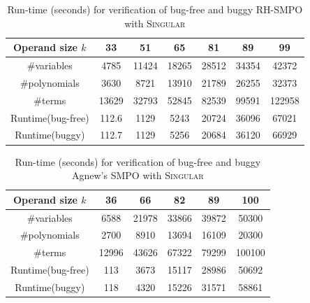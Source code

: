 \begin{table}[bp]
\centering
\caption{\small Run-time (seconds) for verification of bug-free and
  buggy RH-SMPO with \textsc{Singular}} 
\label{tbl:exp1}  
\begin{tabular}{|c||c|c|c|c|c|c|} 
\hline
Operand size $k$ & 33 & 51 & 65 & 81 & 89 & 99\\
\hline
\#variables & 4785 & 11424 & 18265 & 28512 & 34354 & 42372\\
\hline
\#polynomials & 3630 & 8721 & 13910 & 21789 & 26255 & 32373\\
\hline
\#terms & 13629 & 32793 & 52845 & 82539 & 99591 & 122958\\
\hline
\hline
Runtime(bug-free) & 112.6 & 1129 & 5243 & 20724 & 36096 & 67021\\
\hline
Runtime(buggy) & 112.7 & 1129 & 5256 & 20684 & 36120 & 66929\\
\hline
\end{tabular}
\end{table}

\begin{table}[bp]
\centering
\caption{\small Run-time (seconds) for verification of
  bug-free and buggy Agnew's SMPO with \textsc{Singular}}
\label{tbl:exp2}
\begin{tabular}{|c||c|c|c|c|c|} 
\hline
Operand size $k$ & 36 & 66 & 82 & 89 & 100 \\
\hline
\#variables & 6588 & 21978 & 33866 & 39872 & 50300\\
\hline
\#polynomials & 2700 & 8910 & 13694 & 16109 & 20300\\
\hline
\#terms & 12996 & 43626 & 67322 & 79299 & 100100 \\
\hline
\hline
Runtime(bug-free) & 113 & 3673 & 15117 & 28986 & 50692 \\
\hline
Runtime(buggy) & 118 & 4320 & 15226 & 31571 & 58861\\
\hline
\end{tabular}
\end{table}

